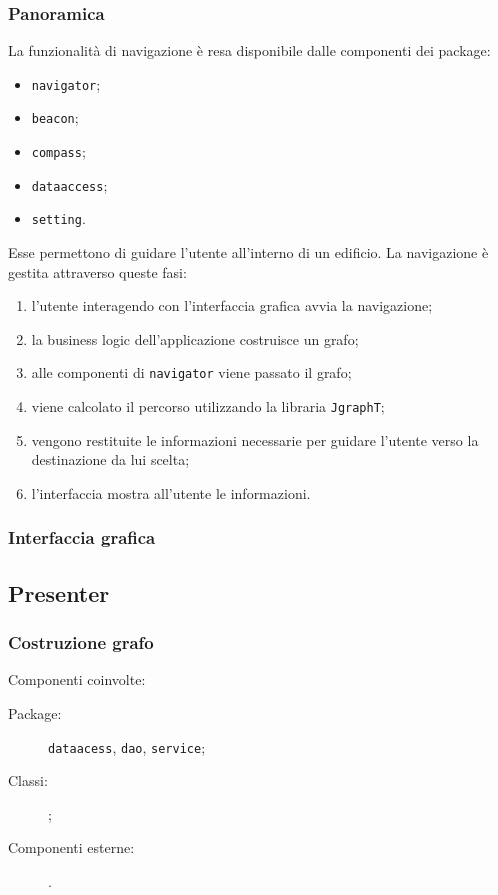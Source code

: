\documentclass[../ManualeSviluppatore.tex]{subfiles}
\begin{document}
		\subsubsection{Panoramica}
			La funzionalità di navigazione è resa disponibile dalle componenti dei package:
			\begin{itemize}
				\item \verb|navigator|;
				\item \verb|beacon|;
				\item \verb|compass|;
				\item \verb|dataaccess|;
				\item \verb|setting|.
			\end{itemize}
			Esse permettono di guidare l'utente all'interno di un edificio.
			La navigazione è gestita attraverso queste fasi:
			\begin{enumerate}
				\item l'utente interagendo con l'interfaccia grafica avvia la navigazione;
				\item la business logic dell'applicazione costruisce un grafo;
				\item alle componenti di \verb|navigator| viene passato il grafo;
				\item viene calcolato il percorso utilizzando la libraria \verb|JgraphT|;
				\item vengono restituite le informazioni necessarie per guidare l'utente verso la destinazione da lui scelta;
				\item l'interfaccia mostra all'utente le informazioni.
			\end{enumerate}
			
		\subsubsection{Interfaccia grafica}
		
		\subsection{Presenter}
		
		\subsubsection{Costruzione grafo}
		
			Componenti coinvolte:
			\begin{description}
				\item[Package:] \verb|dataacess|, \verb|dao|, \verb|service|;
				\item[Classi:] \verb||;
				\item[Componenti esterne:] .
			\end{description}
			
\end{document}
